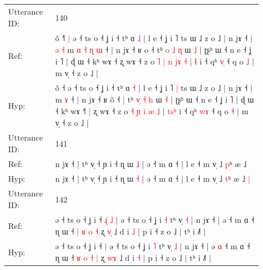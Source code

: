 \documentclass[10pt]{article}
\DeclareRobustCommand{\hl}[1]{{\textcolor{red}{#1}}}
\begin{document}
\begin{longtable}{ll}
 \\
\midrule
Utterance ID: & 140 \\
Ref: & õ ˧\hl{˥}\hl{ }\hl{|} ə ˧ ts o ˧ ʝ i ˧ tʰ ɑ \hl{˩} | l e ˧ ʝ i ˥\hl{}\hl{} ts ɯ ˩ z o ˩ | n jɤ ˧ |\hl{ }\hl{ə}\hl{ }\hl{˧} m\hl{ }\hl{ɑ}\hl{ }\hl{˧}\hl{ }\hl{ɳ} \hl{ɯ} ˧ | n jɤ ˧ ʁ o\hl{} ˧\hl{}\hl{} tʰ \hl{}\hl{o} \hl{˩} \hl{ɳ} ɯ \hl{˩} | ʈʂʰ ɯ ˧ n e ˧ ʝ i ˥ | ɖ ɯ ˧ kʰ wɤ ˧\hl{}\hl{}\hl{} ʐ wɤ ˧ z o \hl{˥} \hl{|} \hl{n} \hl{j}\hl{ɤ} \hl{˧} | \hl{}\hl{}\hl{ɬ} i ˧ qʰ \hl{v}\hl{̩} ˧ q o \hl{˩} | m v̩ ˧ z o ˩ |
 \\
Hyp: & õ ˧\hl{}\hl{}\hl{} ə ˧ ts o ˧ ʝ i ˧ tʰ ɑ \hl{˧} | l e ˧ ʝ i ˥\hl{ }\hl{|} ts ɯ ˩ z o ˩ | n jɤ ˧ |\hl{}\hl{}\hl{}\hl{} m\hl{}\hl{}\hl{}\hl{}\hl{}\hl{} \hl{ɤ} ˧ | n jɤ ˧ ʁ o\hl{̃} ˧\hl{ }\hl{|} tʰ \hl{v}\hl{̩} \hl{˧} \hl{h} ɯ \hl{˧} | ʈʂʰ ɯ ˧ n e ˧ ʝ i ˥ | ɖ ɯ ˧ kʰ wɤ ˧\hl{˥}\hl{ }\hl{|} ʐ wɤ ˧ z o \hl{˧} \hl{ɲ} \hl{i} \hl{}\hl{æ} \hl{˩} | \hl{t}\hl{s}\hl{ʰ} i ˧ qʰ \hl{w}\hl{ɤ} ˧ q o \hl{˧} | m v̩ ˧ z o ˩ |
 \\
\midrule
Utterance ID: & 141 \\
Ref: & n jɤ ˧ | tʰ v̩ ˧ ɲ i ˧ ɳ ɯ \hl{˩} | ə ˧ m ɑ ˧ | l e ˧ m v̩ ˩ \hl{p}ʰ æ ˩\hl{}\hl{}
 \\
Hyp: & n jɤ ˧ | tʰ v̩ ˧ ɲ i ˧ ɳ ɯ \hl{˧} | ə ˧ m ɑ ˧ | l e ˧ m v̩ ˩ \hl{t}ʰ æ ˩\hl{ }\hl{|}
 \\
\midrule
Utterance ID: & 142 \\
Ref: & ə ˧ ts o ˧ ʝ i ˧\hl{ }\hl{ɻ}\hl{̍}\hl{ }\hl{˩} | ə ˧ ts o ˧ ʝ i \hl{˧} tʰ v̩ \hl{˧} | n jɤ ˧ | ə\hl{}\hl{} ˧ m ɑ ˧ ɳ ɯ ˧ \hl{|} \hl{ʁ} \hl{o} \hl{˧} ʐ \hl{v}\hl{̩} ˩ d i \hl{˩} | p i ˧ z o ˩ | tʰ i ˩˥ |
 \\
Hyp: & ə ˧ ts o ˧ ʝ i ˧\hl{}\hl{}\hl{}\hl{}\hl{} | ə ˧ ts o ˧ ʝ i \hl{˥} tʰ v̩ \hl{˩} | n jɤ ˧ | ə\hl{ }\hl{ɑ} ˧ m ɑ ˧ ɳ ɯ ˧ \hl{ʁ} \hl{o} \hl{˧} \hl{|} ʐ \hl{w}\hl{ɤ} ˩ d i \hl{˧} | p i ˧ z o ˩ | tʰ i ˩˥ |
 \\
\midrule
\end{longtable}
\end{document}
